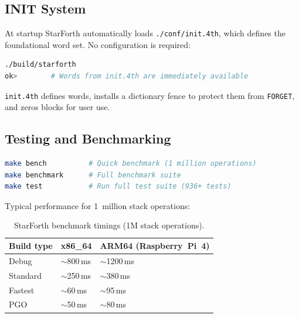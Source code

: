 \subsection{INIT System}
\label{sec:quickstart-init}

At startup StarForth automatically loads \texttt{./conf/init.4th}, which
defines the foundational word set.  No configuration is required:

\begin{lstlisting}[language=bash]
./build/starforth
ok>        # Words from init.4th are immediately available
\end{lstlisting}

\texttt{init.4th} defines words, installs a dictionary fence to protect them
from \texttt{FORGET}, and zeros blocks for user use.

\subsection{Testing and Benchmarking}
\label{sec:quickstart-test}

\begin{lstlisting}[language=bash]
make bench          # Quick benchmark (1 million operations)
make benchmark      # Full benchmark suite
make test           # Run full test suite (936+ tests)
\end{lstlisting}

Typical performance for 1~million stack operations:

\begin{table}[h]
  \centering
  \begin{tabular}{lll}
    \toprule
    Build type  & x86\_64    & ARM64 (Raspberry~Pi~4) \\
    \midrule
    Debug       & $\sim$800\,ms   & $\sim$1200\,ms \\
    Standard    & $\sim$250\,ms   & $\sim$380\,ms  \\
    Fastest     & $\sim$60\,ms    & $\sim$95\,ms   \\
    PGO         & $\sim$50\,ms    & $\sim$80\,ms   \\
    \bottomrule
  \end{tabular}
  \caption{StarForth benchmark timings (1M stack operations).}
  \label{tab:quickstart-bench}
\end{table}

